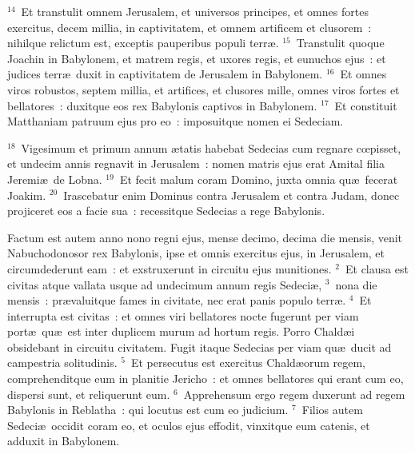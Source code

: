 ${}^{14}$~Et transtulit omnem Jerusalem, et universos principes, et omnes fortes exercitus, decem millia, in captivitatem, et omnem artificem et clusorem~: nihilque relictum est, exceptis pauperibus populi terr\ae .
${}^{15}$~Transtulit quoque Joachin in Babylonem, et matrem regis, et uxores regis, et eunuchos ejus~: et judices terr\ae\ duxit in captivitatem de Jerusalem in Babylonem.
${}^{16}$~Et omnes viros robustos, septem millia, et artifices, et clusores mille, omnes viros fortes et bellatores~: duxitque eos rex Babylonis captivos in Babylonem.
${}^{17}$~Et constituit Matthaniam patruum ejus pro eo~: imposuitque nomen ei Sedeciam.


${}^{18}$~Vigesimum et primum annum \ae tatis habebat Sedecias cum regnare cœpisset, et undecim annis regnavit in Jerusalem~: nomen matris ejus erat Amital filia Jeremi\ae\ de Lobna.
${}^{19}$~Et fecit malum coram Domino, juxta omnia qu\ae\ fecerat Joakim.
${}^{20}$~Irascebatur enim Dominus contra Jerusalem et contra Judam, donec projiceret eos a facie sua~: recessitque Sedecias a rege Babylonis.

\lettrine[lines=10,image=true,loversize=0.05,lraise=-0.03]{F}{}actum est autem anno nono regni ejus, mense decimo, decima die mensis, venit Nabuchodonosor rex Babylonis, ipse et omnis exercitus ejus, in Jerusalem, et circumdederunt eam~: et exstruxerunt in circuitu ejus munitiones.
${}^{2}$~Et clausa est civitas atque vallata usque ad undecimum annum regis Sedeci\ae ,
${}^{3}$~nona die mensis~: pr\ae valuitque fames in civitate, nec erat panis populo terr\ae .
${}^{4}$~Et interrupta est civitas~: et omnes viri bellatores nocte fugerunt per viam port\ae\ qu\ae\ est inter duplicem murum ad hortum regis. Porro Chald\ae i obsidebant in circuitu civitatem. Fugit itaque Sedecias per viam qu\ae\ ducit ad campestria solitudinis.
${}^{5}$~Et persecutus est exercitus Chald\ae orum regem, comprehenditque eum in planitie Jericho~: et omnes bellatores qui erant cum eo, dispersi sunt, et reliquerunt eum.
${}^{6}$~Apprehensum ergo regem duxerunt ad regem Babylonis in Reblatha~: qui locutus est cum eo judicium.
${}^{7}$~Filios autem Sedeci\ae\ occidit coram eo, et oculos ejus effodit, vinxitque eum catenis, et adduxit in Babylonem.


